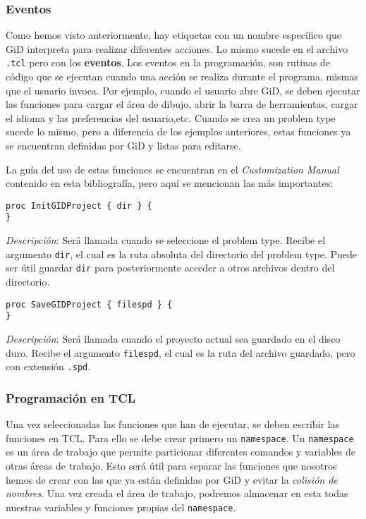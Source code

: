 \documentclass[10pt, a4paper, twocolumn]{article} %
\begin{document}
\subsubsection{Eventos}
Como hemos visto anteriormente, hay etiquetas con un nombre específico que GiD interpreta para realizar diferentes acciones. Lo mismo sucede en el archivo \texttt{.tcl} pero con los \textbf{eventos}. Los eventos en la programación, son rutinas de código que se ejecutan cuando una acción se realiza durante el programa, mismas que el usuario invoca. Por ejemplo, cuando el usuario abre GiD, se deben ejecutar las funciones para cargar el área de dibujo, abrir la barra de herramientas, cargar el idioma y las preferencias del usuario,etc. Cuando se crea un problem type sucede lo mismo, pero a diferencia de los ejemplos anteriores, estas funciones ya se encuentran definidas por GiD y listas para editarse.

La guía del uso de estas funciones se encuentran en el \textit{Customization Manual} contenido en esta bibliografía, pero aquí se mencionan las más importantes:

\lstset{language=tcl} 
\begin{lstlisting}
proc InitGIDProject { dir } {
}
\end{lstlisting}

\textit{Descripción}: Será llamada cuando se seleccione el problem type. Recibe el argumento \texttt{dir}, el cual es la ruta absoluta del directorio del problem type. Puede ser útil guardar \texttt{dir} para posteriormente  acceder a otros archivos dentro del directorio.

\begin{lstlisting}
proc SaveGIDProject { filespd } {
}
\end{lstlisting}

\textit{Descripción}: Será llamada cuando el proyecto actual sea guardado en el disco duro. Recibe el argumento \texttt{filespd}, el cual es la ruta del archivo guardado, pero con extensión \texttt{.spd}.

\subsubsection{Programación en TCL}

Una vez seleccionadas las funciones que han de ejecutar, se deben escribir las funciones en TCL. Para ello se debe crear primero un \texttt{namespace}. Un \texttt{namespace} es un área de trabajo que permite particionar diferentes comandos y variables de otras áreas de trabajo. Esto será útil para separar las funciones que nosotros hemos de crear con las que ya están definidas por GiD y evitar la \textit{colisión de nombres}. Una vez creada el área de trabajo, podremos almacenar en esta todas nuestras variables y funciones propias del \texttt{namespace}.
\end{document}
